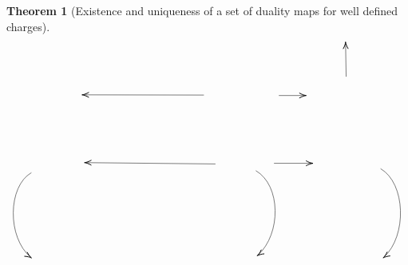 \documentclass[a4paper,12pt]{article}
\newtheorem{Theorem}{Theorem}[section]
\begin{document}
\begin{Theorem}[Existence and uniqueness of a set of duality maps for well defined charges]
\begin{equation}
\begin{tikzpicture}[x=0.62pt,y=0.75pt,yscale=-1,xscale=1]
\draw    (587.93,173.93) -- (587.04,130.72) ;
\draw [shift={(586.99,128.72)}, rotate = 88.81] [color={rgb, 255:red, 0; green, 0; blue, 0 }  ][line width=0.75]    (10.93,-3.29) .. controls (6.95,-1.4) and (3.31,-0.3) .. (0,0) .. controls (3.31,0.3) and (6.95,1.4) .. (10.93,3.29)   ;
\draw    (482.18,198.39) -- (523.26,198.39) ;
\draw [shift={(525.26,198.39)}, rotate = 180] [color={rgb, 255:red, 0; green, 0; blue, 0 }  ][line width=0.75]    (10.93,-3.29) .. controls (6.95,-1.4) and (3.31,-0.3) .. (0,0) .. controls (3.31,0.3) and (6.95,1.4) .. (10.93,3.29)   ;
\draw    (364.48,197.81) -- (174.96,197.52) ;
\draw [shift={(172.96,197.52)}, rotate = 0.09] [color={rgb, 255:red, 0; green, 0; blue, 0 }  ][line width=0.75]    (10.93,-3.29) .. controls (6.95,-1.4) and (3.31,-0.3) .. (0,0) .. controls (3.31,0.3) and (6.95,1.4) .. (10.93,3.29)   ;
\draw    (382.67,287.38) -- (178.84,285.66) ;
\draw [shift={(176.84,285.64)}, rotate = 0.48] [color={rgb, 255:red, 0; green, 0; blue, 0 }  ][line width=0.75]    (10.93,-3.29) .. controls (6.95,-1.4) and (3.31,-0.3) .. (0,0) .. controls (3.31,0.3) and (6.95,1.4) .. (10.93,3.29)   ;
\draw    (474.54,286.52) -- (533.81,286.52) ;
\draw [shift={(535.81,286.52)}, rotate = 180] [color={rgb, 255:red, 0; green, 0; blue, 0 }  ][line width=0.75]    (10.93,-3.29) .. controls (6.95,-1.4) and (3.31,-0.3) .. (0,0) .. controls (3.31,0.3) and (6.95,1.4) .. (10.93,3.29)   ;
\draw    (642,293.5) .. controls (681.58,312.52) and (684.02,380.81) .. (647.13,408.67) ;
\draw [shift={(646,409.5)}, rotate = 324.34] [color={rgb, 255:red, 0; green, 0; blue, 0 }  ][line width=0.75]    (10.93,-3.29) .. controls (6.95,-1.4) and (3.31,-0.3) .. (0,0) .. controls (3.31,0.3) and (6.95,1.4) .. (10.93,3.29)   ;
\draw    (93.55,298.69) .. controls (56.26,316.35) and (55.12,383.01) .. (92.57,408.79) ;
\draw [shift={(93.72,409.56)}, rotate = 213.13] [color={rgb, 255:red, 0; green, 0; blue, 0 }  ][line width=0.75]    (10.93,-3.29) .. controls (6.95,-1.4) and (3.31,-0.3) .. (0,0) .. controls (3.31,0.3) and (6.95,1.4) .. (10.93,3.29)   ;
\draw    (446.02,296.08) .. controls (485.6,315.1) and (486.25,378.17) .. (449.32,405.93) ;
\draw [shift={(448.19,406.76)}, rotate = 324.34] [color={rgb, 255:red, 0; green, 0; blue, 0 }  ][line width=0.75]    (10.93,-3.29) .. controls (6.95,-1.4) and (3.31,-0.3) .. (0,0) .. controls (3.31,0.3) and (6.95,1.4) .. (10.93,3.29)   ;

\end{tikzpicture}
\end{equation}
\end{Theorem}
\end{document}
